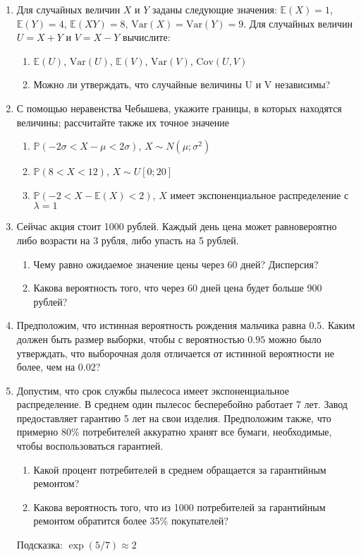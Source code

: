 \documentclass[12pt,a4paper]{article}
\newcommand{\E}{\mathbb{E}}
\renewcommand{\P}{\mathbb{P}}
\newcommand{\Var}{\mathrm{Var}}
\newcommand{\Cov}{\mathrm{Cov}}
\begin{document}
\begin{enumerate}
\item Для случайных величин $X$ и $Y$ заданы следующие значения: $\E(X)=1$, $\E(Y)=4$, $\E(XY)=8$, $\Var(X)=\Var(Y)=9$. Для случайных величин $U=X+Y$ и $V=X-Y$ вычислите: 
\begin{enumerate}
\item $\E(U)$, $\Var(U)$, $\E(V)$, $\Var(V)$, $\Cov(U,V)$ 
\item Можно ли утверждать, что случайные величины U и V независимы? 
\end{enumerate}

\item С помощью неравенства Чебышева, укажите границы, в которых
находятся величины; рассчитайте также их точное значение 
\begin{enumerate}
\item  $\P(-2\sigma<X-\mu<2\sigma)$, $X\sim N(\mu;\sigma^{2})$ 
\item  $\P(8<X<12)$, $X\sim U[0;20]$ 
\item $\P(-2<X-\E(X)<2)$, $X$ имеет экспоненциальное распределение с
$\lambda=1$
\end{enumerate}


\item Сейчас акция стоит 1000 рублей. Каждый день цена может равновероятно либо возрасти на 3 рубля, либо упасть на 5 рублей. 
\begin{enumerate}
\item Чему равно ожидаемое значение цены через 60 дней? Дисперсия?
\item Какова вероятность того, что через 60 дней цена будет больше 900 рублей? 
\end{enumerate}


\item Предположим, что истинная вероятность рождения мальчика равна $0.5$. Каким должен быть размер выборки, чтобы с вероятностью $0.95$ можно было утверждать, что выборочная доля отличается от истинной вероятности не более, чем на $0.02$?

\item Допустим, что срок службы пылесоса имеет экспоненциальное распределение. В среднем один пылесос бесперебойно работает 7 лет. Завод предоставляет гарантию 5 лет на свои изделия. Предположим также, что примерно 80\% потребителей аккуратно хранят все бумаги, необходимые, чтобы воспользоваться гарантией. 
\begin{enumerate}
\item Какой процент потребителей в среднем обращается за гарантийным ремонтом? 
\item Какова вероятность того, что из 1000 потребителей за гарантийным ремонтом обратится более 35\% покупателей? 
\end{enumerate}
Подсказка: $\exp(5/7)\approx 2$ 

\end{enumerate}
\end{document}
